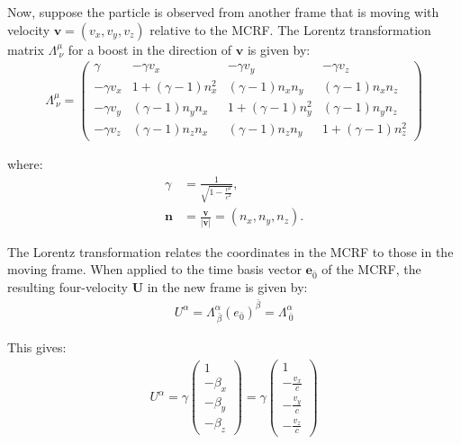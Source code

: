\documentclass[12pt]{book}
\begin{document}
            Now, suppose the particle is observed from another frame that is moving with velocity \( \mathbf{v} = (v_x, v_y, v_z) \) relative to the MCRF. The Lorentz transformation matrix \( \Lambda^\mu_{\ \nu} \) for a boost in the direction of \( \mathbf{v} \) is given by:
            \begin{align}
            \Lambda^\mu_{\ \nu} =
            \begin{pmatrix}
            \gamma & -\gamma v_x & -\gamma v_y & -\gamma v_z \\
            -\gamma v_x & 1 + (\gamma - 1)n_x^2 & (\gamma - 1)n_x n_y & (\gamma - 1)n_x n_z \\
            -\gamma v_y & (\gamma - 1)n_y n_x & 1 + (\gamma - 1)n_y^2 & (\gamma - 1)n_y n_z \\
            -\gamma v_z & (\gamma - 1)n_z n_x & (\gamma - 1)n_z n_y & 1 + (\gamma - 1)n_z^2
            \end{pmatrix}
            \end{align}
            
            where:
            \begin{align*}
            \gamma &= \frac{1}{\sqrt{1 - \frac{v^2}{c^2}}}, \\
            \mathbf{n} &= \frac{\mathbf{v}}{|\mathbf{v}|} = (n_x, n_y, n_z).
            \end{align*}
            
            The Lorentz transformation relates the coordinates in the MCRF to those in the moving frame. When applied to the time basis vector \( \mathbf{e}_{\bar{0}} \) of the MCRF, the resulting four-velocity \( \mathbf{U} \) in the new frame is given by:  
            \begin{align}
            U^\alpha = \Lambda^\alpha_{\ \bar{\beta}} (e_{\bar{0}})^{\bar{\beta}} = \Lambda^\alpha_{\ \bar{0}}
            \end{align}
            
            This gives:
            \begin{align}
            U^\alpha = \gamma \begin{pmatrix} 1 \\ -\beta_x \\ -\beta_y \\ -\beta_z \end{pmatrix} 
            = \gamma \begin{pmatrix} 1 \\ -\frac{v_x}{c} \\ -\frac{v_y}{c} \\ -\frac{v_z}{c} \end{pmatrix}
            \end{align}
            
\end{document}
